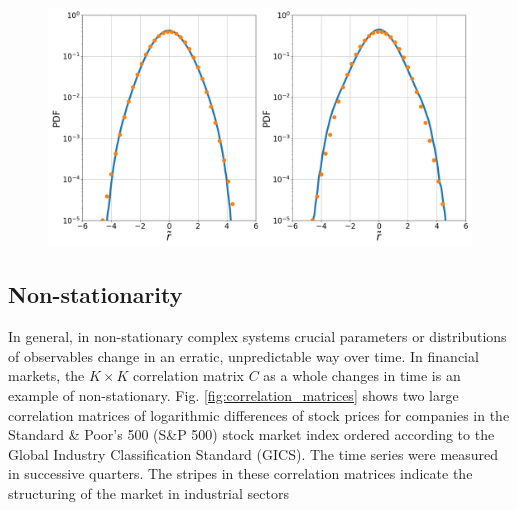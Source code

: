 \begin{figure}[htbp]
    \centering
    \includegraphics[width=\columnwidth]
    {figures/03_agg_returns_epoch.png}
    \caption{}
    \label{fig:agg_returns_epoch}
\end{figure}

\subsection{Non-stationarity}\label{subsec:non_stationarity}

In general, in non-stationary complex systems crucial parameters or
distributions of observables change in an erratic, unpredictable way over time.
In financial markets, the $K \times K$ correlation matrix $C$ as a whole
changes in time is an example of non-stationary. Fig.
\ref{fig:correlation_matrices} shows two large correlation matrices of
logarithmic differences of stock prices for companies in the Standard \&
Poor's 500 (S\&P 500) stock market index ordered according to the Global
Industry Classification Standard (GICS). The time series were measured in
successive quarters. The stripes in these correlation matrices indicate the
structuring of the market in industrial sectors
\cite{state_crisis_7,non_stationarity_fin_guhr}

